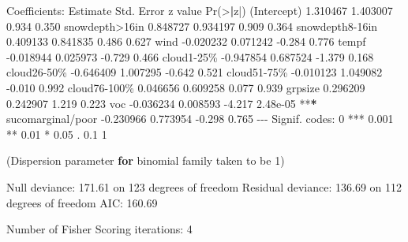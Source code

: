 \documentclass[
]{article}
\newenvironment{Shaded}{\begin{snugshade}}{\end{snugshade}}
\newcommand{\ControlFlowTok}[1]{\textcolor[rgb]{0.13,0.29,0.53}{\textbf{#1}}}
\newcommand{\DecValTok}[1]{\textcolor[rgb]{0.00,0.00,0.81}{#1}}
\newcommand{\ErrorTok}[1]{\textcolor[rgb]{0.64,0.00,0.00}{\textbf{#1}}}
\newcommand{\FloatTok}[1]{\textcolor[rgb]{0.00,0.00,0.81}{#1}}
\newcommand{\FunctionTok}[1]{\textcolor[rgb]{0.00,0.00,0.00}{#1}}
\newcommand{\NormalTok}[1]{#1}
\newcommand{\SpecialCharTok}[1]{\textcolor[rgb]{0.00,0.00,0.00}{#1}}
\newcommand{\StringTok}[1]{\textcolor[rgb]{0.31,0.60,0.02}{#1}}
\begin{document}
\begin{Shaded}
\begin{Highlighting}[]
\NormalTok{Coefficients}\SpecialCharTok{:}
\NormalTok{                   Estimate Std. Error z value }\FunctionTok{Pr}\NormalTok{(}\SpecialCharTok{\textgreater{}}\ErrorTok{|}\NormalTok{z}\SpecialCharTok{|}\NormalTok{)    }
\NormalTok{(Intercept)        }\FloatTok{1.310467}   \FloatTok{1.403007}   \FloatTok{0.934}    \FloatTok{0.350}    
\NormalTok{snowdepth}\SpecialCharTok{\textgreater{}}\NormalTok{16in     }\FloatTok{0.848727}   \FloatTok{0.934197}   \FloatTok{0.909}    \FloatTok{0.364}    
\NormalTok{snowdepth8}\SpecialCharTok{{-}}\NormalTok{16in    }\FloatTok{0.409133}   \FloatTok{0.841835}   \FloatTok{0.486}    \FloatTok{0.627}    
\NormalTok{wind              }\SpecialCharTok{{-}}\FloatTok{0.020232}   \FloatTok{0.071242}  \SpecialCharTok{{-}}\FloatTok{0.284}    \FloatTok{0.776}    
\NormalTok{tempf             }\SpecialCharTok{{-}}\FloatTok{0.018944}   \FloatTok{0.025973}  \SpecialCharTok{{-}}\FloatTok{0.729}    \FloatTok{0.466}    
\NormalTok{cloud1}\DecValTok{{-}25}\NormalTok{\%        }\SpecialCharTok{{-}}\FloatTok{0.947854}   \FloatTok{0.687524}  \SpecialCharTok{{-}}\FloatTok{1.379}    \FloatTok{0.168}    
\NormalTok{cloud26}\DecValTok{{-}50}\NormalTok{\%       }\SpecialCharTok{{-}}\FloatTok{0.646409}   \FloatTok{1.007295}  \SpecialCharTok{{-}}\FloatTok{0.642}    \FloatTok{0.521}    
\NormalTok{cloud51}\DecValTok{{-}75}\NormalTok{\%       }\SpecialCharTok{{-}}\FloatTok{0.010123}   \FloatTok{1.049082}  \SpecialCharTok{{-}}\FloatTok{0.010}    \FloatTok{0.992}    
\NormalTok{cloud76}\DecValTok{{-}100}\NormalTok{\%       }\FloatTok{0.046656}   \FloatTok{0.609258}   \FloatTok{0.077}    \FloatTok{0.939}    
\NormalTok{grpsize            }\FloatTok{0.296209}   \FloatTok{0.242907}   \FloatTok{1.219}    \FloatTok{0.223}    
\NormalTok{voc               }\SpecialCharTok{{-}}\FloatTok{0.036234}   \FloatTok{0.008593}  \SpecialCharTok{{-}}\FloatTok{4.217} \FloatTok{2.48e{-}05} \SpecialCharTok{**}\ErrorTok{*}
\NormalTok{sucomarginal}\SpecialCharTok{/}\NormalTok{poor }\SpecialCharTok{{-}}\FloatTok{0.230966}   \FloatTok{0.773954}  \SpecialCharTok{{-}}\FloatTok{0.298}    \FloatTok{0.765}    
\SpecialCharTok{{-}{-}{-}}
\NormalTok{Signif. codes}\SpecialCharTok{:}  \DecValTok{0} \StringTok{\textquotesingle{}***\textquotesingle{}} \FloatTok{0.001} \StringTok{\textquotesingle{}**\textquotesingle{}} \FloatTok{0.01} \StringTok{\textquotesingle{}*\textquotesingle{}} \FloatTok{0.05} \StringTok{\textquotesingle{}.\textquotesingle{}} \FloatTok{0.1} \StringTok{\textquotesingle{} \textquotesingle{}} \DecValTok{1}

\NormalTok{(Dispersion parameter }\ControlFlowTok{for}\NormalTok{ binomial family taken to be }\DecValTok{1}\NormalTok{)}

\NormalTok{    Null deviance}\SpecialCharTok{:} \FloatTok{171.61}\NormalTok{  on }\DecValTok{123}\NormalTok{  degrees of freedom}
\NormalTok{Residual deviance}\SpecialCharTok{:} \FloatTok{136.69}\NormalTok{  on }\DecValTok{112}\NormalTok{  degrees of freedom}
\NormalTok{AIC}\SpecialCharTok{:} \FloatTok{160.69}

\NormalTok{Number of Fisher Scoring iterations}\SpecialCharTok{:} \DecValTok{4}
\end{Highlighting}
\end{Shaded}
\end{document}
